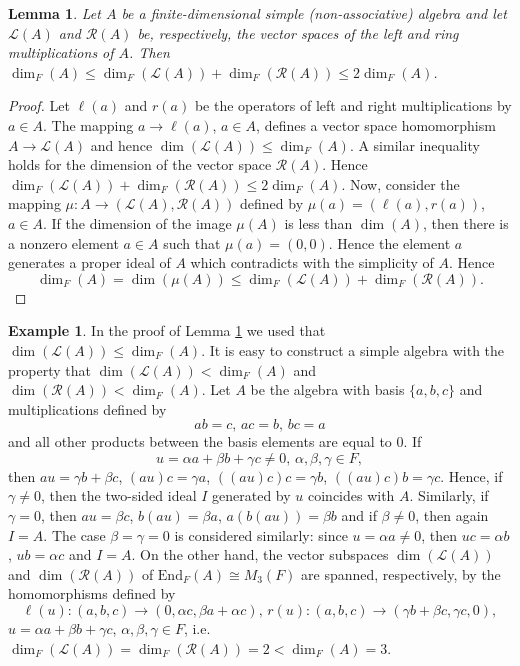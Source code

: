 \documentclass[10]{amsart}
\newtheorem{lemma}[theorem]{Lemma}
\theoremstyle{definition}
\newtheorem{example}[theorem]{Example}
\begin{document}
\begin{lemma}\label{dimensions of multiplication}
Let $A$ be a finite-dimensional simple (non-associative) algebra and let ${\mathcal L}(A)$ and ${\mathcal R}(A)$ be, respectively, the vector spaces of the left and ring multiplications of $A$.
Then $\dim_F(A)\leq \dim_F({\mathcal L}(A))+\dim_F({\mathcal R}(A))\leq 2\dim_F(A)$.
\end{lemma}

\begin{proof}
Let $\ell(a)$ and $r(a)$ be the operators of left and right multiplications by $a\in A$. The mapping $a\to\ell(a)$, $a\in A$, defines a vector space homomorphism $A\to {\mathcal L}(A)$
and hence $\dim({\mathcal L}(A))\leq\dim_F(A)$. A similar inequality holds for the dimension of the vector space ${\mathcal R}(A)$.
Hence $\dim_F({\mathcal L}(A))+\dim_F({\mathcal R}(A))\leq 2\dim_F(A)$. Now, consider the mapping $\mu:A\to ({\mathcal L}(A),{\mathcal R}(A))$
defined by $\mu(a)=(\ell(a),r(a))$, $a\in A$. If the dimension of the image $\mu(A)$ is less than $\dim(A)$, then there is a nonzero element $a\in A$ such that $\mu(a)=(0,0)$.
Hence the element $a$ generates a proper ideal of $A$ which contradicts with the simplicity of $A$. Hence
\[
\dim_F(A)=\dim(\mu(A))\leq \dim_F({\mathcal L}(A))+\dim_F({\mathcal R}(A)).
\]
\end{proof}

\begin{example}\label{lower bound for dimension}
In the proof of Lemma \ref{dimensions of multiplication} we used that $\dim({\mathcal L}(A))\leq\dim_F(A)$. It is easy to construct a simple algebra with the property that
$\dim({\mathcal L}(A))<\dim_F(A)$ and $\dim({\mathcal R}(A))<\dim_F(A)$. Let $A$ be the algebra with basis $\{a,b,c\}$ and multiplications defined by
\[
ab=c,\,ac=b,\,bc=a
\]
and all other products between the basis elements are equal to 0. If
\[
u=\alpha a+\beta b+\gamma c\not=0,\, \alpha,\beta,\gamma\in F,
\]
then
$au=\gamma b+\beta c$, $(au)c=\gamma a$, $((au)c)c=\gamma b$, $((au)c)b=\gamma c$.
Hence, if $\gamma\not=0$, then the two-sided ideal $I$ generated by $u$ coincides with $A$. Similarly, if $\gamma=0$, then
$au=\beta c$, $b(au)=\beta a$, $a(b(au))=\beta b$
and if $\beta \not=0$, then again $I=A$. The case $\beta=\gamma=0$ is considered similarly: since $u=\alpha a\not=0$, then
$uc=\alpha b$, $ub=\alpha c$ and $I=A$.
On the other hand, the vector subspaces $\dim({\mathcal L}(A))$ and $\dim({\mathcal R}(A))$ of $\text{End}_F(A)\cong M_3(F)$ are spanned, respectively, by the homomorphisms defined by
\[
\ell(u):(a,b,c)\to(0,\alpha c,\beta a+\alpha c),\, r(u):(a,b,c)\to(\gamma b+\beta c,\gamma c,0),
\]
$u=\alpha a+\beta b+\gamma c$, $\alpha,\beta,\gamma\in F$, i.e. $\dim_F({\mathcal L}(A))= \dim_F({\mathcal R}(A))=2<\dim_F(A)=3$.
\end{example}
\end{document}
